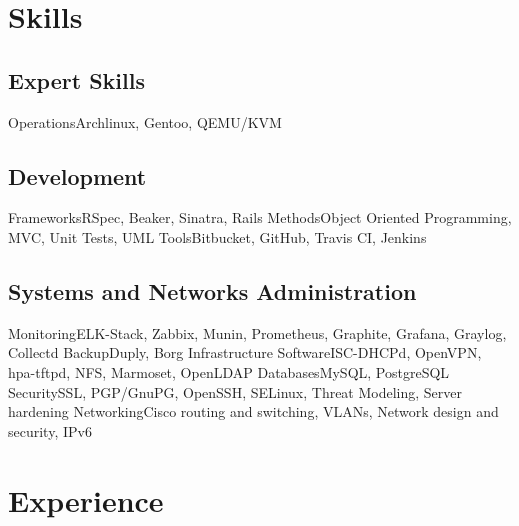

\section{Skills}

\subsection{Expert Skills}
           {Operations}{Archlinux\contributor, Gentoo, QEMU/KVM}

\subsection{Development}
           {Frameworks}{RSpec, Beaker, Sinatra, Rails}
           {Methods}{Object Oriented Programming, MVC, Unit Tests, UML}
           {Tools}{Bitbucket, GitHub, Travis CI, Jenkins}

\subsection{Systems and Networks Administration}
           {Monitoring}{ELK-Stack, Zabbix, Munin, Prometheus, Graphite, Grafana, Graylog, Collectd}
           {Backup}{Duply, Borg}
           {Infrastructure Software}{ISC-DHCPd, OpenVPN, hpa-tftpd, NFS, Marmoset, OpenLDAP}
           {Databases}{MySQL, PostgreSQL}
           {Security}{SSL, PGP/GnuPG, OpenSSH, SELinux, Threat Modeling, Server hardening}
           {Networking}{Cisco routing and switching, VLANs, Network design and security, IPv6}

\newpage

\section{Experience}

